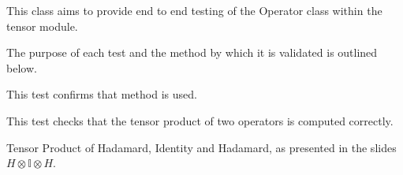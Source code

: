 \documentclass[letterpaper,10pt,english]{sphinxmanual}
\begin{document}
\begin{fulllineitems}
\label{\detokenize{index:tests.test_tensor.TestOperator}}
\pysigstartsignatures
{}
\pysigstopsignatures
\sphinxAtStartPar
This class aims to provide end to end testing of the
Operator class within the tensor module.

\sphinxAtStartPar
The purpose of each test and the method by which it
is validated is outlined below.

\begin{fulllineitems}
\label{\detokenize{index:tests.test_tensor.TestOperator.test_operator_applied_to_vector}}
\pysigstartsignatures
{}
\pysigstopsignatures
\sphinxAtStartPar
This test confirms that  method is used.

\end{fulllineitems}


\begin{fulllineitems}
\label{\detokenize{index:tests.test_tensor.TestOperator.test_operator_tensor_product}}
\pysigstartsignatures
{}
\pysigstopsignatures
\sphinxAtStartPar
This test checks that the tensor product of two operators
is computed correctly.

\end{fulllineitems}


\begin{fulllineitems}
\label{\detokenize{index:tests.test_tensor.TestOperator.test_operator_tensor_product_vs_notes}}
\pysigstartsignatures
{}
\pysigstopsignatures
\sphinxAtStartPar
Tensor Product of Hadamard, Identity and Hadamard, as presented in
the slides \sphinxhyphen{} \(H \otimes \mathbb{I} \otimes H\).


\end{fulllineitems}
\end{fulllineitems}
\end{document}
